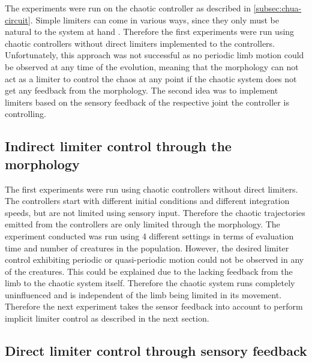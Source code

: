 \documentclass[main]{subfiles}
\begin{document}
The experiments were run on the chaotic controller as described in \ref{subsec:chua-circuit}. Simple limiters can come in various ways, since they only must be natural to the system at hand \cite{bib:Corron2000}. Therefore the first experiments were run using chaotic controllers without direct limiters implemented to the controllers. Unfortunately, this approach was not successful as no periodic limb motion could be observed at any time of the evolution, meaning that the morphology can not act as a limiter to control the chaos at any point if the chaotic system does not get any feedback from the morphology. The second idea was to implement limiters based on the sensory feedback of the respective joint the controller is controlling.

\subsection{Indirect limiter control through the morphology}

The first experiments were run using chaotic controllers without direct limiters. The controllers start with different initial conditions and different integration speeds, but are not limited using sensory input. Therefore the chaotic trajectories emitted from the controllers are only limited through the morphology. The experiment conducted was run using 4 different settings in terms of evaluation time and number of creatures in the population. However, the desired limiter control exhibiting periodic or quasi-periodic motion could not be observed in any of the creatures. This could be explained due to the lacking feedback from the limb to the chaotic system itself. Therefore the chaotic system runs completely uninfluenced and is independent of the limb being limited in its movement. Therefore the next experiment takes the sensor feedback into account to perform implicit limiter control as described in the next section.

\subsection{Direct limiter control through sensory feedback}
\end{document}
